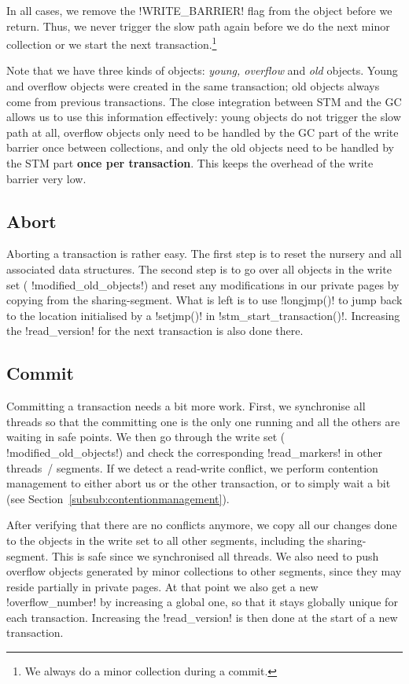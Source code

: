 \documentclass{sigplanconf}
\makeatletter
\renewcommand\lstinline[1][]{%
  \Collectverb{\@@myverb}%
}
\def\@@myverb#1{%
    \begingroup
    \fboxsep=0.2em
    \colorbox{verylightgray}{\oldlstinline|#1|}%
    \endgroup
}
\makeatother
\begin{document}
In all cases, we remove the \lstinline!WRITE_BARRIER!  flag from the
object before we return. Thus, we never trigger the slow path again
before we do the next minor collection or we start the next
transaction.\footnote{We always do a minor collection during a commit.}

Note that we have three kinds of objects: \emph{young, overflow} and
\emph{old} objects. Young and overflow objects were created in the
same transaction; old objects always come from previous transactions.
The close integration between STM and the GC allows us to use this
information effectively: young objects do not trigger the slow path at
all, overflow objects only need to be handled by the GC part of the
write barrier once between collections, and only the old objects need
to be handled by the STM part \textbf{once per transaction}. This keeps the
overhead of the write barrier very low.


\subsection{Abort}

Aborting a transaction is rather easy. The first step is to reset the
nursery and all associated data structures. The second step is to go
over all objects in the write set (\lstinline!modified_old_objects!)
and reset any modifications in our private pages by copying from the
sharing-segment. What is left is to use \lstinline!longjmp()!  to jump
back to the location initialised by a \lstinline!setjmp()!  in
\lstinline!stm_start_transaction()!.  Increasing the
\lstinline!read_version! for the next transaction is also done there.




\subsection{Commit}

Committing a transaction needs a bit more work. First, we synchronise
all threads so that the committing one is the only one running and all
the others are waiting in safe points. We then go through the write
set (\lstinline!modified_old_objects!)  and check the corresponding
\lstinline!read_markers!  in other threads~/ segments. If we detect a
read-write conflict, we perform contention management to either abort us or
the other transaction, or to simply wait a bit (see Section~\ref{subsub:contentionmanagement}).

After verifying that there are no conflicts anymore, we copy all our
changes done to the objects in the write set to all other segments,
including the sharing-segment. This is safe since we synchronised all
threads. We also need to push overflow objects generated by minor
collections to other segments, since they may reside partially in
private pages. At that point we also get a new
\lstinline!overflow_number! by increasing a global one, so that it
stays globally unique for each transaction. Increasing the
\lstinline!read_version!  is then done at the start of a new
transaction.
\end{document}
